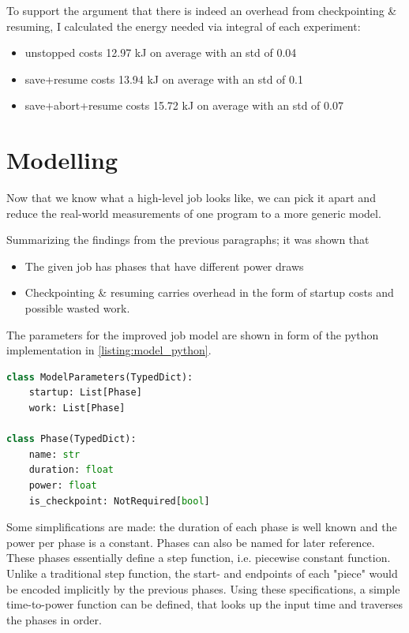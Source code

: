 To support the argument that there is indeed an overhead from checkpointing \& resuming, I calculated the energy needed via integral of each experiment:

\begin{itemize}
    \item  unstopped costs 12.97 kJ on average with an std of 0.04
    \item  save+resume costs 13.94 kJ on average with an std of 0.1
    \item  save+abort+resume costs 15.72 kJ on average with an std of 0.07
\end{itemize}


\section{Modelling}

Now that we know what a high-level job looks like, we can pick it apart and reduce the real-world measurements of one program to a more generic model. 

Summarizing the findings from the previous paragraphs; it was shown that 

\begin{itemize}
    \item The given job has phases that have different power draws
    \item Checkpointing \& resuming carries overhead in the form of startup costs and possible wasted work.
\end{itemize}

The parameters for the improved job model are shown in form of the python implementation in \ref{listing:model_python}. 

\begin{lstlisting}[language=python, frame=single, numbers=none, caption={Python Model definition}, basicstyle=\ttfamily, label={listing:model_python}]
class ModelParameters(TypedDict):
    startup: List[Phase]
    work: List[Phase]
    
class Phase(TypedDict):
    name: str
    duration: float
    power: float
    is_checkpoint: NotRequired[bool]   
\end{lstlisting}

Some simplifications are made: the duration of each phase is well known and the power per phase is a constant. 
Phases can also be named for later reference.
These phases essentially define a step function, i.e. piecewise constant function.
Unlike a traditional step function, the start- and endpoints of each "piece" would be encoded implicitly by the previous phases.
Using these specifications, a simple time-to-power function can be defined, that looks up the input time and traverses the phases in order.

